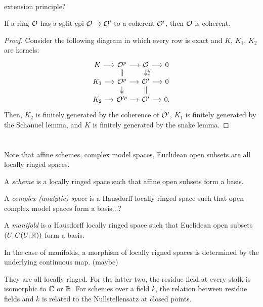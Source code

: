 \documentclass{../../large}
\begin{document}
\begin{prb}\,
\begin{parts}
\item extension principle?
\item If a ring $\mathcal{O}$ has a split epi $\mathcal{O}\to\mathcal{O}'$ to a coherent $\mathcal{O}'$, then $\mathcal{O}$ is coherent.
\end{parts}
\end{prb}
\begin{proof}
Consider the following diagram in which every row is exact and $K$, $K_1$, $K_2$ are kernels:
\[\begin{tikzcd}[sep=small]
K \rar & \cO^p \rar\dar[equals] & \cO \rar\dar[two heads] & 0\\
K_1 \rar & \cO^p \rar\dar[two heads] & \cO' \rar\dar[equals]\uar[hookrightarrow,bend right] & 0\\
K_2 \rar & \cO'^p \rar & \cO' \rar & 0.
\end{tikzcd}\]
Then, $K_2$ is finitely generated by the coherence of $\mathcal{O}'$, $K_1$ is finitely generated by the Schanuel lemma, and $K$ is finitely generated by the snake lemma.
\end{proof}




\section{}

Note that affine schemes, complex model spaces, Euclidean open subsets are all locally ringed spaces.


A \emph{scheme} is a locally ringed space such that affine open subsets form a basis.

A \emph{complex (analytic) space} is a Hausdorff locally ringed space such that open complex model spaces form a basis...?

A \emph{manifold} is a Hausdorff locally ringed space such that Euclidean open subsets $(U,C(U,\mathbb{R}))$ form a basis.



In the case of manifolds, a morphism of locally rigned spaces is determined by the underlying continuous map. (maybe)

They are all locally ringed.
For the latter two, the residue field at every stalk is isomorphic to $\mathbb{C}$ or $\mathbb{R}$.
For schemes over a field $k$, the relation between residue fields and $k$ is related to the Nullstellensatz at closed points.


\section{}
\end{document}
